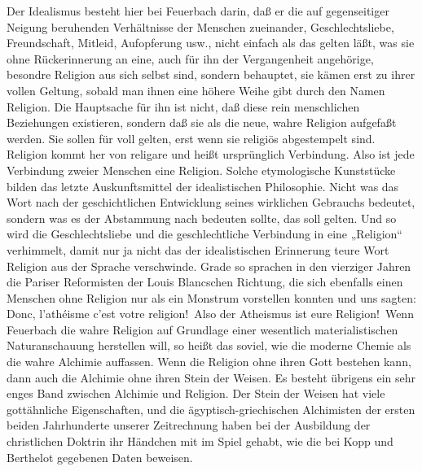 Der Idealismus besteht hier bei Feuerbach darin, daß er die auf
gegenseitiger Neigung beruhenden Verhältnisse der Menschen zueinander,
Geschlechtsliebe, Freundschaft, Mitleid, Aufopferung usw., nicht einfach
als das gelten läßt, was sie ohne Rückerinnerung an eine, auch für ihn
der Vergangenheit angehörige, besondre Religion aus sich selbst sind,
sondern behauptet, sie kämen erst zu ihrer vollen Geltung, sobald man
ihnen eine höhere Weihe gibt durch den Namen Religion. Die Hauptsache
für ihn ist nicht, daß diese rein menschlichen Beziehungen existieren,
sondern daß sie als die neue, wahre Religion aufgefaßt werden. Sie
sollen für voll gelten, erst wenn sie religiös abgestempelt sind.
Religion kommt her von religare und heißt ursprünglich Verbindung. Also
ist jede Verbindung zweier Menschen eine Religion. Solche etymologische
Kunststücke bilden das letzte Auskunftsmittel der idealistischen
Philosophie. Nicht was das Wort nach der geschichtlichen Entwicklung
seines wirklichen Gebrauchs bedeutet, sondern was es der Abstammung nach
bedeuten sollte, das soll gelten. Und so wird die Geschlechtsliebe und
die geschlechtliche Verbindung in eine „Religion`` verhimmelt, damit nur
ja nicht das der idealistischen Erinnerung teure Wort Religion aus der
Sprache verschwinde. Grade so sprachen in den vierziger Jahren die
Pariser Reformisten der Louis Blancschen Richtung, die sich ebenfalls
einen Menschen ohne Religion nur als ein Monstrum vorstellen konnten und
uns sagten: Donc, l'athéisme c'est votre religion! \textbar{}\,Also der
Atheismus ist eure Religion!\,\textbar{} Wenn Feuerbach die wahre Religion
auf Grundlage einer wesentlich materialistischen Naturanschauung
herstellen will, so heißt das soviel, wie die moderne Chemie als die
wahre Alchimie auffassen. Wenn die Religion ohne ihren Gott bestehen
kann, dann auch die Alchimie ohne ihren Stein der Weisen. Es besteht
übrigens ein sehr enges Band zwischen Alchimie und Religion. Der Stein
der Weisen hat viele gottähnliche Eigenschaften, und die
ägyptisch-griechischen Alchimisten der ersten beiden Jahrhunderte
unserer Zeitrechnung haben bei der Ausbildung der christlichen Doktrin
ihr Händchen mit im Spiel gehabt, wie die bei Kopp und Berthelot
gegebenen Daten beweisen.

